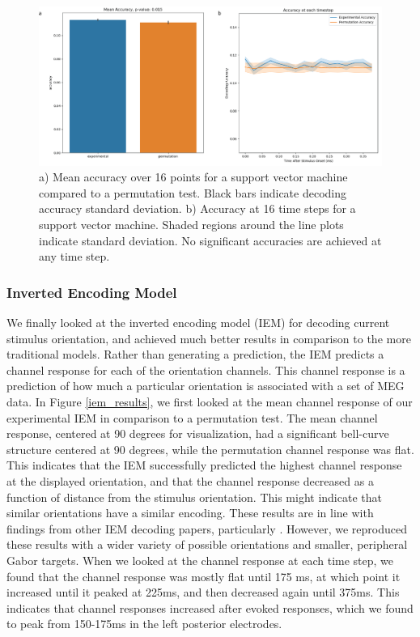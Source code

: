 \documentclass[../main.tex]{subfiles}
\begin{document}
\begin{figure}
    \centering
    \includegraphics[scale=0.7]{figures/results/svm_sensor_accuracy.png}
    \caption{a) Mean accuracy over 16 points for a support vector machine compared to a permutation test. Black bars indicate decoding accuracy standard deviation. b) Accuracy at 16 time steps for a support vector machine. Shaded regions around the line plots indicate standard deviation. No significant accuracies are achieved at any time step.}
    \label{svm_sensor_accuracy}
\end{figure}

\subsubsection*{Inverted Encoding Model}
We finally looked at the inverted encoding model (IEM) for decoding current stimulus orientation, and achieved much better results in comparison to the more traditional models. Rather than generating a prediction, the IEM predicts a channel response for each of the orientation channels. This channel response is a prediction of how much a particular orientation is associated with a set of MEG data. In Figure \ref{iem_results}, we first looked at the mean channel response of our experimental IEM in comparison to a permutation test. The mean channel response, centered at 90 degrees for visualization, had a significant bell-curve structure centered at 90 degrees, while the permutation channel response was flat. This indicates that the IEM successfully predicted the highest channel response at the displayed orientation, and that the channel response decreased as a function of distance from the stimulus orientation. This might indicate that similar orientations have a similar encoding. These results are in line with findings from other IEM decoding papers, particularly \cite{GARCIA2013515}. However, we reproduced these results with a wider variety of possible orientations and smaller, peripheral Gabor targets. When we looked at the channel response at each time step, we found that the channel response was mostly flat until 175 ms, at which point it increased until it peaked at 225ms, and then decreased again until 375ms. This indicates that channel responses increased after evoked responses, which we found to peak from 150-175ms in the left posterior electrodes.
\end{document}
